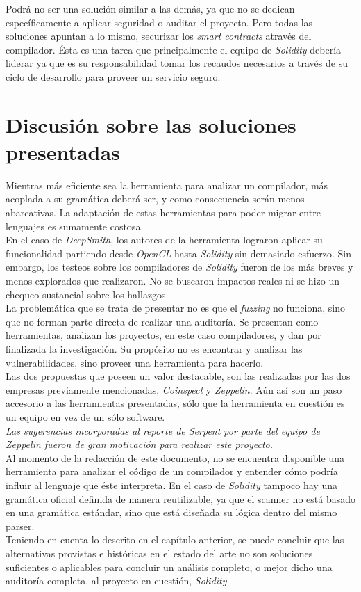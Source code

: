 Podrá no ser una solución similar a las demás, ya que no se dedican específicamente a aplicar seguridad o auditar el proyecto. Pero todas las soluciones apuntan a lo mismo, securizar los \textit{smart contracts} através del compilador. Ésta es una tarea que principalmente el equipo de \textit{Solidity} debería liderar ya que es su responsabilidad tomar los recaudos necesarios a través de su ciclo de desarrollo para proveer un servicio seguro.

\section{Discusión sobre las soluciones presentadas}
Mientras más eficiente sea la herramienta para analizar un compilador, más acoplada a su gramática deberá ser, y como consecuencia serán menos abarcativas. La adaptación de estas herramientas para poder migrar entre lenguajes es sumamente costosa.\\

En el caso de \textit{DeepSmith}, los autores de la herramienta lograron aplicar su funcionalidad partiendo desde \textit{OpenCL} hasta \textit{Solidity} sin demasiado esfuerzo. Sin embargo, los testeos sobre los compiladores de \textit{Solidity} fueron de los más breves y menos explorados que realizaron. No se buscaron impactos reales ni se hizo un chequeo sustancial sobre los hallazgos.\\

La problemática que se trata de presentar no es que el \textit{fuzzing} no funciona, sino que no forman parte directa de realizar una auditoría. Se presentan como herramientas, analizan los proyectos, en este caso compiladores, y dan por finalizada la investigación. Su propósito no es encontrar y analizar las vulnerabilidades, sino proveer una herramienta para hacerlo.\\

Las dos propuestas que poseen un valor destacable, son las realizadas por las dos empresas previamente mencionadas, \textit{Coinspect} y \textit{Zeppelin}. Aún así son un paso accesorio a las herramientas presentadas, sólo que la herramienta en cuestión es un equipo en vez de un sólo software.\\

\textit{Las sugerencias incorporadas al reporte de Serpent por parte del equipo de Zeppelin fueron de gran motivación para realizar este proyecto.}\\

Al momento de la redacción de este documento, no se encuentra disponible una herramienta para analizar el código de un compilador y entender cómo podría influir al lenguaje que éste interpreta. En el caso de \textit{Solidity} tampoco hay una gramática oficial definida de manera reutilizable, ya que el scanner no está basado en una gramática estándar, sino que está diseñada su lógica dentro del mismo parser.\\

Teniendo en cuenta lo descrito en el capítulo anterior, se puede concluir que las alternativas provistas e históricas en el estado del arte no son soluciones suficientes o aplicables para concluir un análisis completo, o mejor dicho una auditoría completa, al proyecto en cuestión, \textit{Solidity}.
